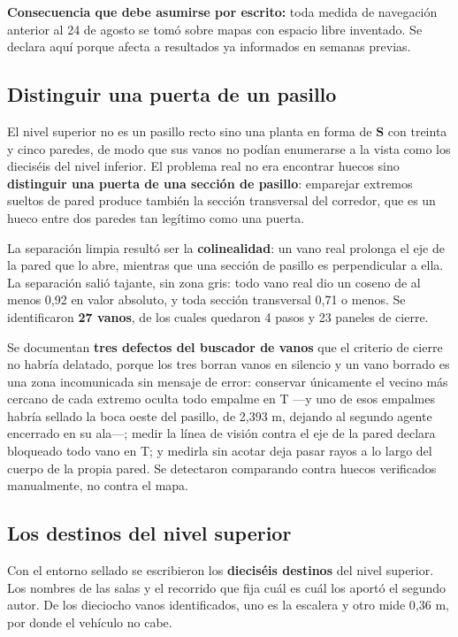 \documentclass[12pt,letterpaper]{article}
\begin{document}
\textbf{Consecuencia que debe asumirse por escrito:} toda medida de navegación anterior al 24 de agosto se tomó sobre mapas con espacio libre inventado. Se declara aquí porque afecta a resultados ya informados en semanas previas.

\subsection{Distinguir una puerta de un pasillo}

El nivel superior no es un pasillo recto sino una planta en forma de \textbf{S} con treinta y cinco paredes, de modo que sus vanos no podían enumerarse a la vista como los dieciséis del nivel inferior. El problema real no era encontrar huecos sino \textbf{distinguir una puerta de una sección de pasillo}: emparejar extremos sueltos de pared produce también la sección transversal del corredor, que es un hueco entre dos paredes tan legítimo como una puerta.

La separación limpia resultó ser la \textbf{colinealidad}: un vano real prolonga el eje de la pared que lo abre, mientras que una sección de pasillo es perpendicular a ella. La separación salió tajante, sin zona gris: todo vano real dio un coseno de al menos 0,92 en valor absoluto, y toda sección transversal 0,71 o menos. Se identificaron \textbf{27 vanos}, de los cuales quedaron 4 pasos y 23 paneles de cierre.

Se documentan \textbf{tres defectos del buscador de vanos} que el criterio de cierre no habría delatado, porque los tres borran vanos en silencio y un vano borrado es una zona incomunicada sin mensaje de error: conservar únicamente el vecino más cercano de cada extremo oculta todo empalme en T ---y uno de esos empalmes habría sellado la boca oeste del pasillo, de 2,393 m, dejando al segundo agente encerrado en su ala---; medir la línea de visión contra el eje de la pared declara bloqueado todo vano en T; y medirla sin acotar deja pasar rayos a lo largo del cuerpo de la propia pared. Se detectaron comparando contra huecos verificados manualmente, no contra el mapa.

\subsection{Los destinos del nivel superior}

Con el entorno sellado se escribieron los \textbf{dieciséis destinos} del nivel superior. Los nombres de las salas y el recorrido que fija cuál es cuál los aportó el segundo autor. De los dieciocho vanos identificados, uno es la escalera y otro mide 0,36 m, por donde el vehículo no cabe.
\end{document}
